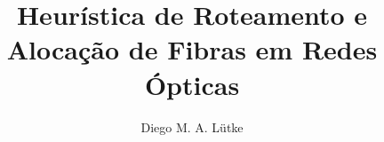 \title{Heurística de Roteamento e Alocação de Fibras em Redes Ópticas}

\author{Diego M. A. Lütke}


\address{Escola Politécnica -- Pontifícia Universidade Católica do Paraná (PUCPR)
}
